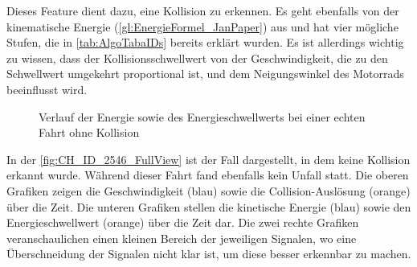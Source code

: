 Dieses Feature dient dazu, eine Kollision zu erkennen. Es geht ebenfalls von der kinematische Energie (\autoref{gl:EnergieFormel_JanPaper}) aus und hat vier mögliche Stufen, die in \autoref{tab:AlgoTabaIDs} bereits erklärt wurden. Es ist allerdings wichtig zu wissen, dass der Kollisionsschwellwert von der Geschwindigkeit, die zu den Schwellwert umgekehrt proportional ist, und dem Neigungswinkel des Motorrads beeinflusst wird.
 

\begin{figure}
	\centering 
	\caption{Verlauf der Energie sowie des Energieschwellwerts bei einer echten Fahrt ohne Kollision}
	\label{fig:CH_ID_2546_FullView}
\end{figure}



In der \autoref{fig:CH_ID_2546_FullView} ist der Fall dargestellt, in dem keine Kollision erkannt wurde. Während dieser Fahrt fand ebenfalls kein Unfall statt. 
Die oberen Grafiken zeigen die Geschwindigkeit (blau) sowie die Collision-Auslösung (orange) über die Zeit.
Die unteren Grafiken stellen die kinetische Energie (blau) sowie den Energieschwellwert (orange) über die Zeit dar.
Die zwei rechte Grafiken veranschaulichen einen kleinen Bereich der jeweiligen Signalen, wo eine Überschneidung der Signalen nicht klar ist, um diese besser erkennbar zu machen.

